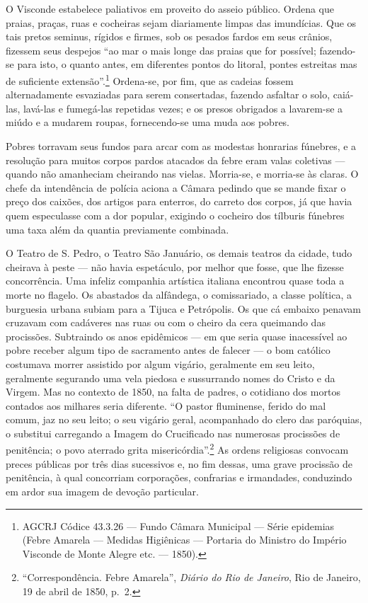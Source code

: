 O Visconde estabelece paliativos em proveito do asseio público. Ordena
que praias, praças, ruas e cocheiras sejam diariamente limpas das
imundícias. Que os tais pretos seminus, rígidos e firmes, sob os pesados
fardos em seus crânios, fizessem seus despejos ``ao mar o mais longe das
praias que for possível; fazendo-se para isto, o quanto antes, em
diferentes pontos do litoral, pontes estreitas mas de suficiente
extensão''.\footnote{AGCRJ Códice 43.3.26 --- Fundo Câmara Municipal ---
  Série epidemias (Febre Amarela --- Medidas Higiênicas --- Portaria do
  Ministro do Império Visconde de Monte Alegre etc. --- 1850).}
Ordena-se, por fim, que as cadeias fossem alternadamente esvaziadas para
serem consertadas, fazendo asfaltar o solo, caiá-las, lavá-las e
fumegá-las repetidas vezes; e os presos obrigados a lavarem-se a miúdo e
a mudarem roupas, fornecendo-se uma muda aos pobres.

Pobres torravam seus fundos para arcar com as modestas honrarias
fúnebres, e a resolução para muitos corpos pardos atacados da febre eram
valas coletivas --- quando não amanheciam cheirando nas vielas.
Morria-se, e morria-se às claras. O chefe da intendência de polícia
aciona a Câmara pedindo que se mande fixar o preço dos caixões, dos
artigos para enterros, do carreto dos corpos, já que havia quem
especulasse com a dor popular, exigindo o cocheiro dos tílburis fúnebres
uma taxa além da quantia previamente combinada.

O Teatro de S. Pedro, o Teatro São Januário, os demais teatros da
cidade, tudo cheirava à peste --- não havia espetáculo, por melhor que
fosse, que lhe fizesse concorrência. Uma infeliz companhia artística
italiana encontrou quase toda a morte no flagelo. Os abastados da
alfândega, o comissariado, a classe política, a burguesia urbana subiam
para a Tijuca e Petrópolis. Os que cá embaixo penavam cruzavam com
cadáveres nas ruas ou com o cheiro da cera queimando das procissões.
Subtraindo os anos epidêmicos --- em que seria quase inacessível ao pobre
receber algum tipo de sacramento antes de falecer --- o bom católico
costumava morrer assistido por algum vigário, geralmente em seu leito,
geralmente segurando uma vela piedosa e sussurrando nomes do Cristo e da
Virgem. Mas no contexto de 1850, na falta de padres, o cotidiano dos
mortos contados aos milhares seria diferente. ``O pastor fluminense,
ferido do mal comum, jaz no seu leito; o seu vigário geral, acompanhado
do clero das paróquias, o substitui carregando a Imagem do Crucificado
nas numerosas procissões de penitência; o povo aterrado grita
misericórdia''.\footnote{``Correspondência. Febre Amarela'',
  \textit{Diário do Rio de Janeiro}, Rio de Janeiro, 19 de abril de 1850,
  p.~2.} As ordens religiosas convocam preces públicas por três dias
sucessivos e, no fim dessas, uma grave procissão de penitência, à qual
concorriam corporações, confrarias e irmandades, conduzindo em ardor sua
imagem de devoção particular.

